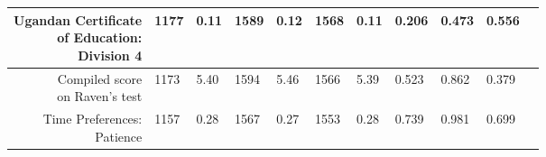 \begin{longtable}{|r|l|l|l|l|l|l|l|l|l|l}
\hline

	 \makecell{Ugandan Certificate\\ of Education:\\ Division 4}                       & 1177                                                               &  0.11                                                              & 1589                                                               &  0.12                                                              & 1568                                                               &  0.11                                                              & 0.206                                                              & 0.473                                                              & 0.556                                                             \\

\hline

	 \makecell{Compiled score\\ on Raven's test}                                     & 1173                                                               &  5.40                                                              & 1594                                                               &  5.46                                                              & 1566                                                               &  5.39                                                              & 0.523                                                              & 0.862                                                              & 0.379                                                             \\

\hline

	 \makecell{Time Preferences: \\Patience}                                         & 1157                                                               &  0.28                                                              & 1567                                                               &  0.27                                                              & 1553                                                               &  0.28                                                              & 0.739                                                              & 0.981                                                              & 0.699                                                             \\


\end{longtable}
